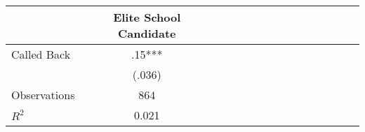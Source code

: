 \begin{tabular}{l*{14}{c}}
                    &\multicolumn{1}{c}{Elite School Candidate}\\
\hline
Called Back         &         .15***\\
                    &      (.036)   \\
\hline
Observations        &         864   \\
\(R^{2}\)           &       0.021   \\
\end{tabular}
